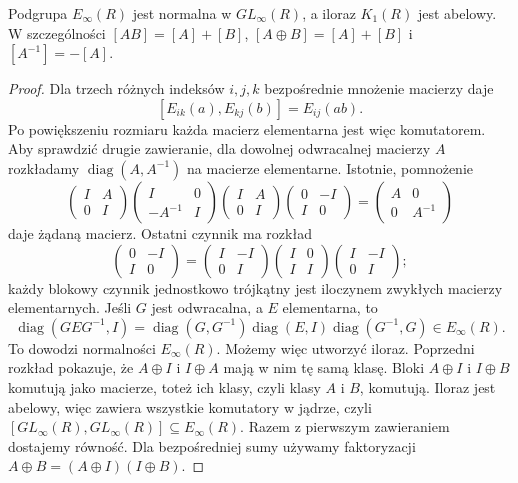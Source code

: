 \begin{stwierdzenie}
\label{prop:k1-abelowa-20}
Podgrupa $E_\infty(R)$ jest normalna w $GL_\infty(R)$,
a iloraz $K_1(R)$ jest abelowy. W szczególności
$[AB]=[A]+[B]$, $[A\oplus B]=[A]+[B]$ i
$[A^{-1}]=-[A]$.
\end{stwierdzenie}
\begin{proof}
Dla trzech różnych indeksów $i,j,k$ bezpośrednie
mnożenie macierzy daje
\[
 [E_{ik}(a),E_{kj}(b)]=E_{ij}(ab).
\]
Po powiększeniu rozmiaru każda macierz elementarna
jest więc komutatorem. Aby sprawdzić drugie
zawieranie, dla dowolnej odwracalnej macierzy
$A$ rozkładamy $\operatorname{diag}(A,A^{-1})$
na macierze elementarne. Istotnie, pomnożenie
\[
 \begin{pmatrix}I&A\\0&I\end{pmatrix}
 \begin{pmatrix}I&0\\-A^{-1}&I\end{pmatrix}
 \begin{pmatrix}I&A\\0&I\end{pmatrix}
 \begin{pmatrix}0&-I\\I&0\end{pmatrix}
 =\begin{pmatrix}A&0\\0&A^{-1}\end{pmatrix}
\]
daje żądaną macierz. Ostatni czynnik ma rozkład
\[
 \begin{pmatrix}0&-I\\I&0\end{pmatrix}
 =\begin{pmatrix}I&-I\\0&I\end{pmatrix}
  \begin{pmatrix}I&0\\I&I\end{pmatrix}
  \begin{pmatrix}I&-I\\0&I\end{pmatrix};
\]
każdy blokowy czynnik jednostkowo trójkątny
jest iloczynem zwykłych macierzy elementarnych.
Jeśli $G$ jest odwracalna, a $E$ elementarna,
to
\[
 \operatorname{diag}(GEG^{-1},I)
 =\operatorname{diag}(G,G^{-1})
  \operatorname{diag}(E,I)
  \operatorname{diag}(G^{-1},G)
 \in E_\infty(R).
\]
To dowodzi normalności $E_\infty(R)$.
Możemy więc utworzyć iloraz. Poprzedni rozkład
pokazuje, że $A\oplus I$ i $I\oplus A$ mają
w nim tę samą klasę. Bloki $A\oplus I$ i $I\oplus B$
komutują jako macierze, toteż ich klasy, czyli
klasy $A$ i $B$, komutują. Iloraz jest abelowy,
więc zawiera wszystkie komutatory w jądrze,
czyli $[GL_\infty(R),GL_\infty(R)]\subseteq E_\infty(R)$.
Razem z pierwszym zawieraniem dostajemy równość.
Dla bezpośredniej sumy używamy faktoryzacji
$A\oplus B=(A\oplus I)(I\oplus B)$.
\end{proof}

